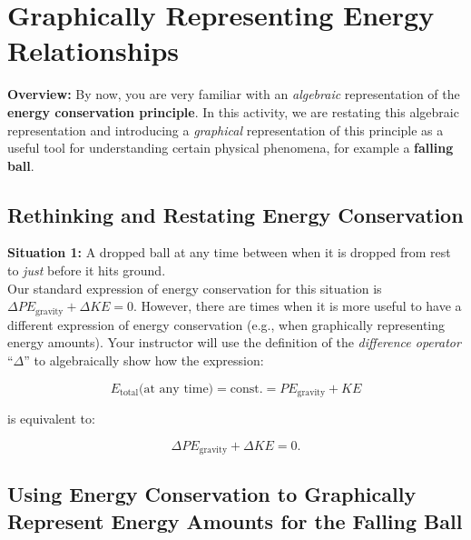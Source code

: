 \section{Graphically Representing Energy Relationships}
\label{act2.3.1}

\begin{overview}

\textbf{Overview:} By now, you are very familiar with an \emph{algebraic} representation of the \textbf{energy conservation principle}. In this activity, we are restating this algebraic representation and introducing a \emph{graphical} representation of this principle as a useful tool for understanding certain physical phenomena, for example a \textbf{falling ball}.

\end{overview}

\subsection{Rethinking and Restating Energy Conservation}

\noindent\textbf{Situation 1:} A dropped ball at any time between when it is dropped from rest to {\em just} before it hits ground.\\

\noindent Our standard expression of energy conservation for this situation is $\Delta PE_\text{gravity} + \Delta KE = 0$. However, there are times when it is more useful to have a different expression of energy conservation (e.g., when graphically representing energy amounts). Your instructor will use the definition of the \emph{difference operator} ``$\Delta$'' to algebraically show how the expression:

\begin{displaymath}
	E_\text{total}\text{(at any time)} = \text{const.} = PE_\text{gravity} + KE
\end{displaymath}

\noindent is equivalent to:

\begin{displaymath}
	\Delta PE_\text{gravity} + \Delta KE = 0.
\end{displaymath}
	
\subsection{Using Energy Conservation to Graphically Represent Energy Amounts for the Falling Ball}
	
